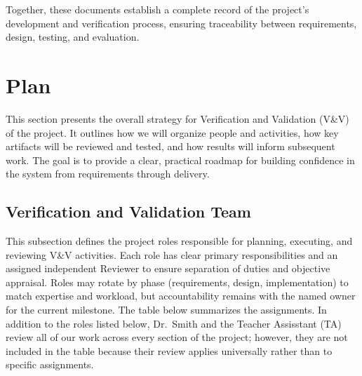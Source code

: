 \documentclass[12pt, titlepage]{article}
\begin{document}
Together, these documents establish a complete record of the project’s development and verification process, ensuring traceability between requirements, design, testing, and evaluation.

\section{Plan}

This section presents the overall strategy for Verification and Validation (V\&V) of the project. It outlines how we will organize people and activities, how key artifacts will be reviewed and tested, and how results will inform subsequent work. The goal is to provide a clear, practical roadmap for building confidence in the system from requirements through delivery.


\subsection{Verification and Validation Team}

This subsection defines the project roles responsible for planning, executing, and reviewing V\&V activities. Each role has clear
primary responsibilities and an assigned independent Reviewer to ensure separation of duties and objective appraisal.
Roles may rotate by phase (requirements, design, implementation) to match expertise and workload, but accountability remains
with the named owner for the current milestone. The table below summarizes the assignments. In addition to the roles listed below, Dr.~Smith and the Teacher Assisstant (TA) review all of our work across every section of the project; however, they are not included in the table because their review applies universally rather than to specific assignments.
\end{document}
